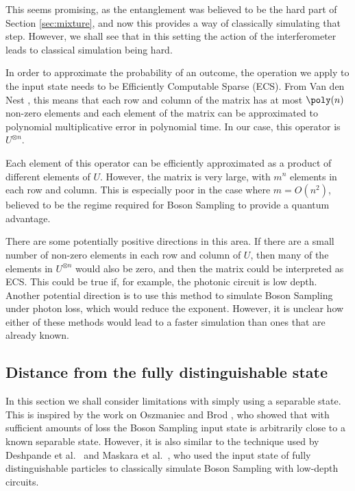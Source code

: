 This seems promising, as the entanglement was believed to be the hard part of Section \ref{sec:mixture}, and now this provides a way of classically simulating that step. However, we shall see that in this setting the action of the interferometer leads to classical simulation being hard.

In order to approximate the probability of an outcome, the operation we apply to the input state needs to be Efficiently Computable Sparse (ECS). From Van den Nest \cite{vandennest2011}, this means that each row and column of the matrix has at most $\poly(n)$ non-zero elements and each element of the matrix can be approximated to polynomial multiplicative error in polynomial time. In our case, this operator is $U^{\otimes n}$.

Each element of this operator can be efficiently approximated as a product of different elements of $U$. However, the matrix is very large, with $m^n$ elements in each row and column. This is especially poor in the case where $m = O(n^2)$, believed to be the regime required for Boson Sampling to provide a quantum advantage.

There are some potentially positive directions in this area. If there are a small number of non-zero elements in each row and column of $U$, then many of the elements in $U^{\otimes n}$ would also be zero, and then the matrix could be interpreted as ECS. This could be true if, for example, the photonic circuit is low depth. Another potential direction is to use this method to simulate Boson Sampling under photon loss, which would reduce the exponent. However, it is unclear how either of these methods would lead to a faster simulation than ones that are already known.

\subsection{Distance from the fully distinguishable state}

In this section we shall consider limitations with simply using a separable state. This is inspired by the work on Oszmaniec and Brod \cite{oszmaniec2018}, who showed that with sufficient amounts of loss the Boson Sampling input state is arbitrarily close to a known separable state. However, it is also similar to the technique used by Deshpande et al.~\cite{deshpande2018} and Maskara et al.~\cite{maskara2019}, who used the input state of fully distinguishable particles to classically simulate Boson Sampling with low-depth circuits.

